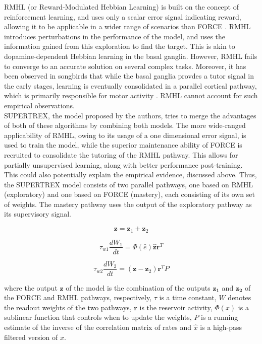 RMHL (or Reward-Modulated Hebbian Learning) is built on the concept of reinforcement learning, and uses only a scalar error signal indicating reward, allowing it to be applicable in a wider range of scenarios than FORCE \cite{hoerzer2014}. RMHL introduces perturbations in the performance of the model, and uses the information gained from this exploration to find the target. This is akin to dopamine-dependent Hebbian learning in the basal ganglia. However, RMHL fails to converge to an accurate solution on several complex tasks. Moreover, it has been observed in songbirds that while the basal ganglia provdes a tutor signal in the early stages, learning is eventually consolidated in a parallel cortical pathway, which is primarily responsible for motor activity \cite{olveczky2011}. RMHL cannot account for such empirical observations.\\


SUPERTREX, the model proposed by the authors, tries to merge the advantages of both of these algorithms by combining both models. The more wide-ranged applicability of RMHL, owing to its usage of a one dimensional error signal, is used to train the model, while the superior maintenance ability of FORCE is recruited to consolidate the tutoring of the RMHL pathway. This allows for partially unsupervised learning, along with better performance post-training. This could also potentially explain the empirical evidence, discussed above. Thus, the SUPERTREX model consists of two parallel pathways, one based on RMHL (exploratory) and one based on FORCE (mastery), each consisting of its own set of weights. The mastery pathway uses the output of the exploratory pathway as its supervisory signal.


\begin{equation}
    \mathbf{z}=\mathbf{z}_{1}+\mathbf{z}_{2}
\end{equation}

\begin{equation}
    \tau_{w 1} \frac{d W_{1}}{d t}=\Phi(\hat{e}) \hat{\mathbf{z}} \mathbf{r}^{T}
\end{equation}

\begin{equation}
    \tau_{w 2} \frac{d W_{2}}{d t}=\left(\mathbf{z}-\mathbf{z}_{2}\right) \mathbf{r}^{T} P
\end{equation}
    
where the output $\mathbf{z}$ of the model is the combination of the outputs $\mathbf{z_1}$ and $\mathbf{z_2}$ of the FORCE and RMHL pathways, respectively, $\tau$ is a time constant, $W$ denotes the readout weights of the two pathways, $\mathbf{r}$ is the reservoir activity,  $\Phi(x)$ is a sublinear function that controls when to update the weights, $P$ is a running estimate of the inverse of the correlation matrix of rates and $\hat{x}$  is a high-pass filtered version of $x$.


